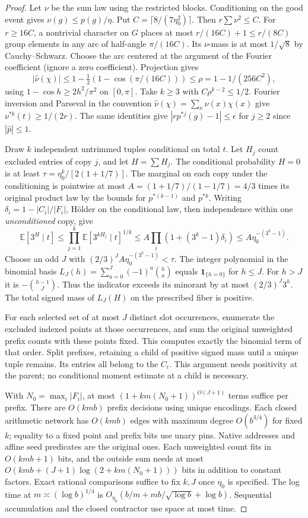 \documentclass[11pt]{article}
\begin{document}
\begin{proof}
Let $\nu$ be the sum law using the restricted blocks. Conditioning on the good event gives $\nu(g)\le p(g)/\eta$. Put $C=\lceil 8/(7\eta_0^2)\rceil$. Then $r\sum\nu^2\le C$. For $r\ge16C$, a nontrivial character on $G$ places at most $r/(16C)+1\le r/(8C)$ group elements in any arc of half-angle $\pi/(16C)$. Its $\nu$-mass is at most $1/\sqrt8$ by Cauchy--Schwarz. Choose the arc centered at the argument of the Fourier coefficient (ignore a zero coefficient). Projection gives
\[
 |\widehat\nu(\chi)|\le 1-\tfrac12(1-\cos(\pi/(16C)))\le \rho=1-1/(256C^2),
\]
using $1-\cos h\ge2h^2/\pi^2$ on $[0,\pi]$. Take $k\ge3$ with $C\rho^{k-2}\le1/2$. Fourier inversion and Parseval in the convention $\widehat\nu(\chi)=\sum_x\nu(x)\chi(x)$ give $\nu^{*k}(t)\ge1/(2r)$. The same identities give $|rp^{*j}(g)-1|\le\epsilon$ for $j\ge2$ since $|\widehat p|\le1$.

Draw $k$ independent untrimmed tuples conditional on total $t$. Let $H_j$ count excluded entries of copy $j$, and let $H=\sum H_j$. The conditional probability $H=0$ is at least $\tau=\eta_0^k/[2(1+1/7)]$. The marginal on each copy under the conditioning is pointwise at most $A=(1+1/7)/(1-1/7)=4/3$ times its original product law by the bounds for $p^{*(k-1)}$ and $p^{*k}$. Writing $\delta_i=1-|C_i|/|F_i|$, H\"older on the conditional law, then independence within one \emph{unconditioned} copy, give
\[
 \mathbb E[3^H\mid t]\le
 \prod_{j=1}^k\mathbb E[3^{kH_j}\mid t]^{1/k}
 \le A\prod_i(1+(3^k-1)\delta_i)
 \le A\eta_0^{-(3^k-1)}.
\]
Choose an odd $J$ with $(2/3)^J A\eta_0^{-(3^k-1)}<\tau$. The integer polynomial in the binomial basis $L_J(h)=\sum_{a=0}^J(-1)^a\binom ha$ equals $\mathbf1_{\{h=0\}}$ for $h\le J$. For $h>J$ it is $-\binom{h-1}J$. Thus the indicator exceeds its minorant by at most $(2/3)^J3^h$. The total signed mass of $L_J(H)$ on the prescribed fiber is positive.

For each selected set of at most $J$ distinct slot occurrences, enumerate the excluded indexed points at those occurrences, and sum the original unweighted prefix counts with these points fixed. This computes exactly the binomial term of that order. Split prefixes, retaining a child of positive signed mass until a unique tuple remains. Its entries all belong to the $C_i$. This argument needs positivity at the parent; no conditional moment estimate at a child is necessary.

With $N_0=\max_i |F_i|$, at most $(1+km(N_0+1))^{O(J+1)}$ terms suffice per prefix. There are $O(kmb)$ prefix decisions using unique encodings. Each closed arithmetic network has $O(kmb)$ edges with maximum degree $O(b^{3/4})$ for fixed $k$; equality to a fixed point and prefix bits use unary pins. Native addresses and affine seed predicates are the original ones. Each unweighted count fits in $O(kmb+1)$ bits, and the outside sum needs at most $O(kmb+(J+1)\log(2+km(N_0+1)))$ bits in addition to constant factors. Exact rational comparisons suffice to fix $k,J$ once $\eta_0$ is specified. The log time at $m\asymp(\log b)^{1/4}$ is $O_{\eta_0}(b/m+mb/\sqrt{\log b}+\log b)$. Sequential accumulation and the closed contractor use space at most time.
\end{proof}
\end{document}

